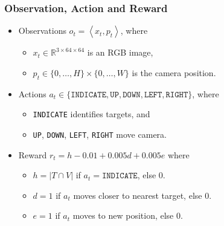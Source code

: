 \begin{frame}
    \frametitle{Observation, Action and Reward}

    \begin{itemize}
        \item Observations \(o_t = \left\langle x_t, p_t \right\rangle\), where
        \begin{itemize}
            \item \(x_t \in \mathbb{R}^{3 \times 64 \times 64}\) is an RGB image,
            \item \(p_t \in \{0, \dots, H\} \times \{0, \dots, W\}\) is the camera position.
        \end{itemize}
        \item Actions \(a_t \in \{\texttt{INDICATE}, \texttt{UP}, \texttt{DOWN}, \texttt{LEFT}, \texttt{RIGHT}\}\), where
        \begin{itemize}
            \item \texttt{INDICATE} identifies targets, and
            \item \texttt{UP}, \texttt{DOWN}, \texttt{LEFT}, \texttt{RIGHT} move camera.
        \end{itemize}
        \item Reward \(r_t = h - 0.01 + 0.005d + 0.005e\) where
        \begin{itemize}
            \item \(h = \left\vert T \cap V \right\vert\) if \(a_t = \texttt{INDICATE}\), else \(0\).
            \item \(d = 1\) if \(a_t\) moves closer to nearest target, else \(0\).
            \item \(e = 1\) if \(a_t\) moves to new position, else \(0\).
        \end{itemize}
    \end{itemize}
\end{frame}

